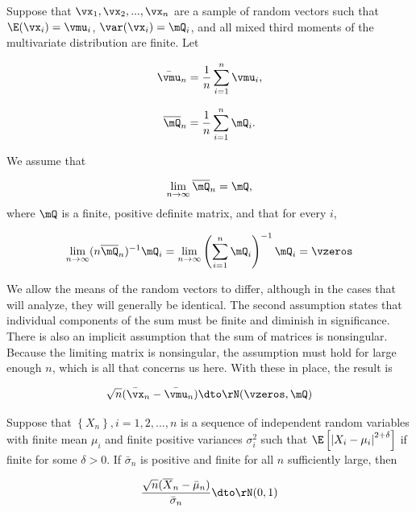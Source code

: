 \documentclass[english,12pt]{book}\usepackage[]{graphicx}\usepackage[]{xcolor}
\begin{document}
\begin{theorem}\label{theorem:LF_CLT_M}
Suppose that $\vx_1, \vx_2,...,\vx_n$ are a sample of random vectors such that $\E(\vx_i) = \vmu_i$, $\var(\vx_i) = \mQ_i$, and all mixed third moments of the multivariate distribution are finite. Let

\begin{equation*}
  \bar{\vmu}_n = \frac{1}{n}\sum_{i = 1}^n\vmu_i,
\end{equation*}

\begin{equation*}
  \overline{\mQ}_n = \frac{1}{n}\sum_{i = 1}^n\mQ_i.
\end{equation*}

We assume that

\begin{equation*}
  \lim_{n \to \infty}\overline{\mQ}_n  = \mQ,
\end{equation*}
%
where $\mQ$ is a finite, positive definite matrix, and that for every $i$,

\begin{equation*}
  \lim_{n \to \infty}(n\overline{\mQ}_n)^{-1}\mQ_i = \lim_{n \to \infty}\left(\sum_{i = 1}^n \mQ_i\right)^{-1} \mQ_i = \vzeros
\end{equation*}

We allow the means of the random vectors to differ, although in the cases that will analyze, they will generally be identical. The second assumption states that individual components of the sum must be finite and diminish in significance. There is also an implicit assumption that the sum of matrices is nonsingular. Because the limiting matrix is nonsingular, the assumption must hold for large enough $n$, which is all that concerns us here. With these in place, the result is

\begin{equation*}
  \sqrt{n}(\bar{\vx}_n - \bar{\vmu}_n)\dto \rN(\vzeros, \mQ)
\end{equation*}
\end{theorem}

\begin{theorem}
Suppose that $\left\lbrace X_n\right\rbrace, i = 1, 2,...,n$ is a sequence of independent random variables with finite mean $\mu_i$ and finite positive variances $\sigma^2_i$ such that $\E\left[\left|X_i - \mu_i\right|^{2 + \delta}\right]$ if finite for some $\delta > 0$. If $\bar{\sigma}_n$ is positive and finite for all $n$ sufficiently large, then

\begin{equation*}
  \frac{\sqrt{n}(\overline{X}_n - \bar{\mu}_n)}{\bar{\sigma}_n}\dto\rN(0, 1)
\end{equation*}
\end{theorem}
\end{document}
